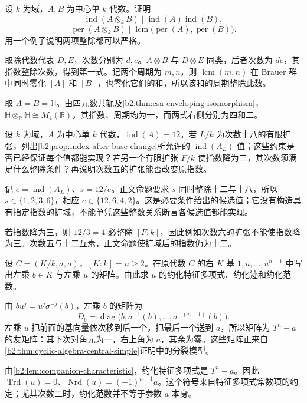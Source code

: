 \begin{exercise}\label{b2:ex:18-tensor-index-period-bounds}
	设 \(k\) 为域，\(A,B\) 为中心单 \(k\) 代数。证明
	\[
		\operatorname{ind}(A\otimes_kB)\mid\operatorname{ind}(A)\operatorname{ind}(B),
	\]
	\[
		\operatorname{per}(A\otimes_kB)\mid \operatorname{lcm}\bigl(\operatorname{per}(A),\operatorname{per}(B)\bigr).
	\]
	用一个例子说明两项整除都可以严格。
\end{exercise}
\begin{solution}
	取除代数代表 \(D,E\)，次数分别为 \(d,e\)。\(A\otimes B\) 与 \(D\otimes E\) 同类，后者次数为 \(de\)，其指数整除次数，得到第一式。记两个周期为 \(m,n\)，则 \(\operatorname{lcm}(m,n)\) 在 Brauer 群中同时零化 \([A]\) 和 \([B]\)，也零化它们的和，所以该和的周期整除此数。

	取 \(A=B=\mathbb H\)。由四元数共轭及\cref{b2:thm:csa-enveloping-isomorphism}，\(\mathbb H\otimes_{\mathbb R}\mathbb H\cong M_4(\mathbb R)\)，其指数、周期均为一，而两式右侧分别为四和二。
\end{solution}

\begin{exercise}\label{b2:ex:18-index-after-extension}
	设 \(k\) 为域，\(A\) 为中心单 \(k\) 代数，\(\operatorname{ind}(A)=12\)。若 \(L/k\) 为次数十八的有限扩张，列出\cref{b2:prop:index-after-base-change}所允许的 \(\operatorname{ind}(A_L)\) 值；这些约束是否已经保证每个值都能实现？若另一个有限扩张 \(F/k\) 使指数降为三，其次数须满足什么整除条件？再说明次数五的扩张能否改变原指数。
\end{exercise}
\begin{solution}
	记 \(e=\operatorname{ind}(A_L)\)、\(s=12/e\)。正文命题要求 \(s\) 同时整除十二与十八，所以 \(s\in\{1,2,3,6\}\)，相应 \(e\in\{12,6,4,2\}\)。这是必要条件给出的候选值；它没有构造具有指定指数的扩域，不能单凭这些整数关系断言各候选值都能实现。

	若指数降为三，则 \(12/3=4\) 必整除 \([F:k]\)，因此例如次数六的扩张不能使指数降为三。次数五与十二互素，正文命题使扩域后的指数仍为十二。
\end{solution}

\begin{exercise}\label{b2:ex:18-cyclic-splitting-matrices}
	设 \(C=(K/k,\sigma,a)\)，\([K:k]=n\ge2\)。在原代数 \(C\) 的右 \(K\) 基 \(1,u,\ldots,u^{n-1}\) 中写出左乘 \(b\in K\) 与左乘 \(u\) 的矩阵。由此求 \(u\) 的约化特征多项式、约化迹和约化范数。
\end{exercise}
\begin{solution}
	由 \(bu^j=u^j\sigma^{-j}(b)\)，左乘 \(b\) 的矩阵为
	\[
		D_b=\operatorname{diag}\bigl(b,\sigma^{-1}(b),\ldots,\sigma^{-(n-1)}(b)\bigr).
	\]
	左乘 \(u\) 把前面的基向量依次移到后一个，把最后一个送到 \(a\)，所以矩阵为 \(T^n-a\) 的友矩阵：其下次对角元为一，右上角为 \(a\)，其余为零。这些矩阵正来自\cref{b2:thm:cyclic-algebra-central-simple}证明中的分裂模型。

	由\cref{b2:lem:companion-characteristic}，约化特征多项式是 \(T^n-a\)。因此 \(\operatorname{Trd}(u)=0\)、\(\operatorname{Nrd}(u)=(-1)^{n-1}a\)。这个符号来自特征多项式常数项的约定；尤其次数二时，约化范数并不等于参数 \(a\) 本身。
\end{solution}


